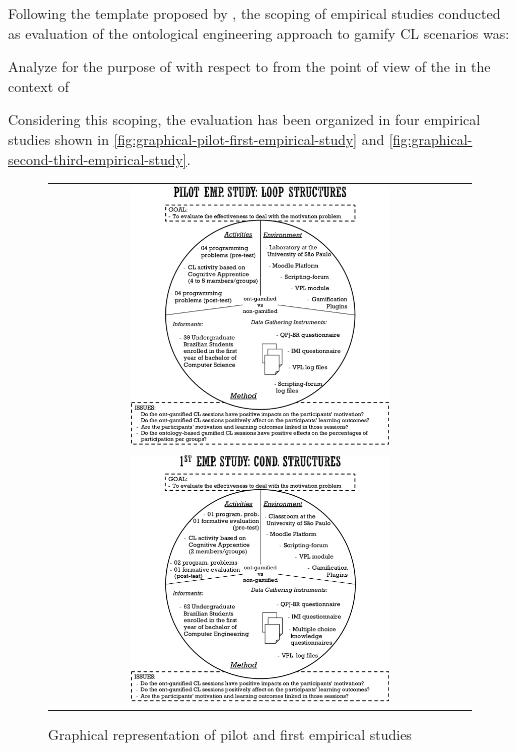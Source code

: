 Following the template proposed by , the scoping of empirical studies conducted as evaluation of the ontological engineering approach to gamify CL scenarios was:

Analyze  for the purpose of  with respect to  from the point of view of the  in the context of 

Considering this scoping, the evaluation has been organized in four empirical studies shown in \autoref{fig:graphical-pilot-first-empirical-study} and \autoref{fig:graphical-second-third-empirical-study}.

\newpage
\begin{figure}[htb]
 \caption{Graphical representation of pilot and first empirical studies}
 \label{fig:graphical-pilot-first-empirical-study}
 \centering
 \begin{tabular}{c}
  \includegraphics[width=0.63\textwidth]{images/chap-evaluation/graphical-pilot-empirical-study}\\
  \includegraphics[width=0.63\textwidth]{images/chap-evaluation/graphical-first-empirical-study}
 \end{tabular}
 \fautor
\end{figure}

